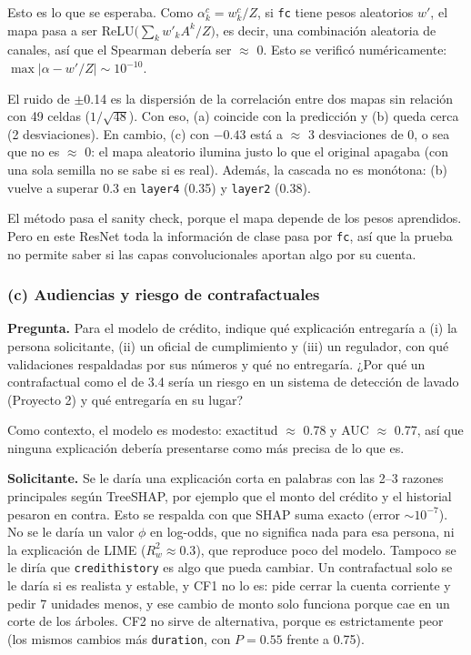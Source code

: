 \documentclass[11pt]{article}
\renewcommand{\_}{\textunderscore\allowbreak{}}
\begin{document}
Esto es lo que se esperaba. Como \(\alpha_k^c = w_k^c/Z\), si \texttt{fc} tiene pesos aleatorios \(w'\), el mapa pasa a ser \(\mathrm{ReLU}\big(\sum_k w'_k A^k / Z\big)\), es decir, una combinación aleatoria de canales, así que el Spearman debería ser \(\approx\) 0. Esto se verificó numéricamente: \(\max|\alpha - w'/Z| \sim 10^{-10}\).

El ruido de \(\pm\)0.14 es la dispersión de la correlación entre dos mapas sin relación con 49 celdas (\(1/\sqrt{48}\)). Con eso, (a) coincide con la predicción y (b) queda cerca (2 desviaciones). En cambio, (c) con \(-0.43\) está a \(\approx\) 3 desviaciones de 0, o sea que no es \(\approx\) 0: el mapa aleatorio ilumina justo lo que el original apagaba (con una sola semilla no se sabe si es real). Además, la cascada no es monótona: (b) vuelve a superar 0.3 en \texttt{layer4} (0.35) y \texttt{layer2} (0.38).

El método pasa el sanity check, porque el mapa depende de los pesos aprendidos. Pero en este ResNet toda la información de clase pasa por \texttt{fc}, así que la prueba no permite saber si las capas convolucionales aportan algo por su cuenta.

\subsubsection*{(c) Audiencias y riesgo de contrafactuales}
\begin{tcolorbox}[colback=yellow!12, colframe=orange!70!black, boxrule=0.5pt, left=4pt, right=4pt]
\textbf{Pregunta.} Para el modelo de crédito, indique qué explicación entregaría a (i) la persona solicitante, (ii) un oficial de cumplimiento y (iii) un regulador, con qué validaciones respaldadas por sus números y qué no entregaría. ¿Por qué un contrafactual como el de 3.4 sería un riesgo en un sistema de detección de lavado (Proyecto 2) y qué entregaría en su lugar?
\end{tcolorbox}

Como contexto, el modelo es modesto: exactitud \(\approx\) 0.78 y AUC \(\approx\) 0.77, así que ninguna explicación debería presentarse como más precisa de lo que es.

\textbf{Solicitante.} Se le daría una explicación corta en palabras con las 2--3 razones principales según TreeSHAP, por ejemplo que el monto del crédito y el historial pesaron en contra. Esto se respalda con que SHAP suma exacto (error \(\sim10^{-7}\)). No se le daría un valor \(\phi\) en log-odds, que no significa nada para esa persona, ni la explicación de LIME (\(R^2_w \approx 0.3\)), que reproduce poco del modelo. Tampoco se le diría que \texttt{credit\_history} es algo que pueda cambiar. Un contrafactual solo se le daría si es realista y estable, y CF1 no lo es: pide cerrar la cuenta corriente y pedir 7 unidades menos, y ese cambio de monto solo funciona porque cae en un corte de los árboles. CF2 no sirve de alternativa, porque es estrictamente peor (los mismos cambios más \texttt{duration}, con \(P = 0.55\) frente a 0.75).
\end{document}
